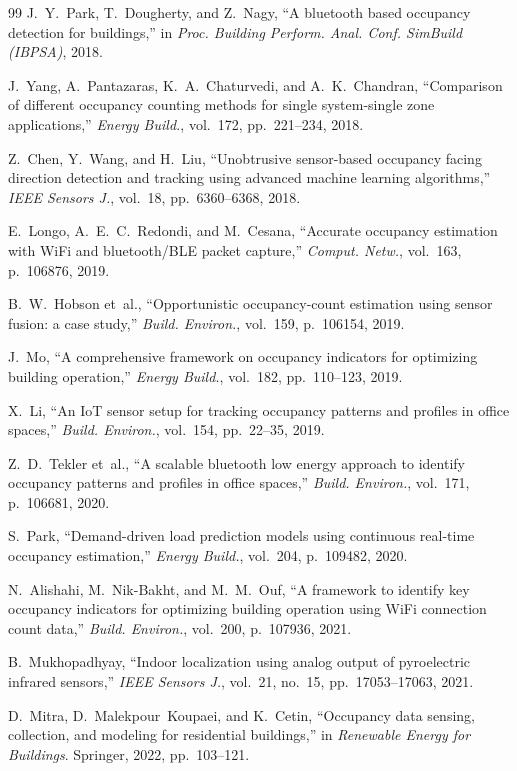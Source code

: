 \begin{thebibliography}{99}
J.~Y.~Park, T.~Dougherty, and Z.~Nagy, ``A bluetooth based occupancy detection for buildings,'' in \textit{Proc. Building Perform. Anal. Conf. SimBuild (IBPSA)}, 2018.

J.~Yang, A.~Pantazaras, K.~A.~Chaturvedi, and A.~K.~Chandran, ``Comparison of different occupancy counting methods for single system-single zone applications,'' \textit{Energy Build.}, vol.~172, pp.~221--234, 2018.

Z.~Chen, Y.~Wang, and H.~Liu, ``Unobtrusive sensor-based occupancy facing direction detection and tracking using advanced machine learning algorithms,'' \textit{IEEE Sensors J.}, vol.~18, pp.~6360--6368, 2018.

E.~Longo, A.~E.~C.~Redondi, and M.~Cesana, ``Accurate occupancy estimation with WiFi and bluetooth/BLE packet capture,'' \textit{Comput. Netw.}, vol.~163, p.~106876, 2019.

B.~W.~Hobson et~al., ``Opportunistic occupancy-count estimation using sensor fusion: a case study,'' \textit{Build. Environ.}, vol.~159, p.~106154, 2019.

J.~Mo, ``A comprehensive framework on occupancy indicators for optimizing building operation,'' \textit{Energy Build.}, vol.~182, pp.~110--123, 2019.

X.~Li, ``An IoT sensor setup for tracking occupancy patterns and profiles in office spaces,'' \textit{Build. Environ.}, vol.~154, pp.~22--35, 2019.

Z.~D.~Tekler et~al., ``A scalable bluetooth low energy approach to identify occupancy patterns and profiles in office spaces,'' \textit{Build. Environ.}, vol.~171, p.~106681, 2020.

S.~Park, ``Demand-driven load prediction models using continuous real-time occupancy estimation,'' \textit{Energy Build.}, vol.~204, p.~109482, 2020.

N.~Alishahi, M.~Nik-Bakht, and M.~M.~Ouf, ``A framework to identify key occupancy indicators for optimizing building operation using WiFi connection count data,'' \textit{Build. Environ.}, vol.~200, p.~107936, 2021.

B.~Mukhopadhyay, ``Indoor localization using analog output of pyroelectric infrared sensors,'' \textit{IEEE Sensors J.}, vol.~21, no.~15, pp.~17053--17063, 2021.

D.~Mitra, D.~Malekpour~Koupaei, and K.~Cetin, ``Occupancy data sensing, collection, and modeling for residential buildings,'' in \textit{Renewable Energy for Buildings}. Springer, 2022, pp.~103--121.


\end{thebibliography}
